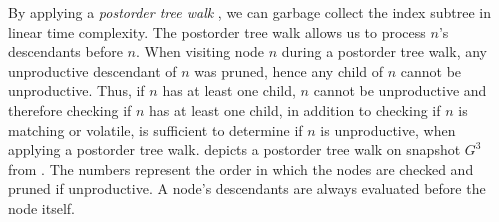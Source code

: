 \documentclass[abstracton,12pt]{scrartcl}
\theoremstyle{definition}
\begin{document}
By applying a
\textit{postorder tree walk} \cite{Cormen}, we can garbage collect the
index subtree in linear time complexity. The postorder tree walk allows us to
process $n$'s descendants before $n$. 
When visiting node $n$ during a postorder tree walk, any unproductive descendant
of $n$ was pruned, hence any child of $n$ cannot be unproductive. Thus, if $n$
has at least one child, $n$ cannot be unproductive and therefore checking if $n$
has at least one child, in addition to checking if $n$ is matching or volatile,
is sufficient to determine if $n$ is unproductive, when applying a postorder
tree walk.
 depicts a postorder tree walk on snapshot $G^3$ from
. The numbers represent the
order in which the nodes are checked and pruned if unproductive. A node's
descendants are always evaluated before the node itself.
\end{document}
